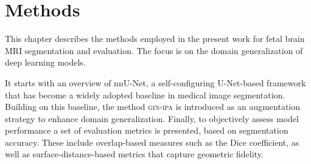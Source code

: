 \chapter{Methods} \label{chap:Methods}
\vspace{1cm}

This chapter describes the methods employed in the present work for fetal brain MRI segmentation and evaluation. The focus is on the domain generalization of deep learning models.

It starts with an overview of nnU-Net, a self-configuring U-Net-based framework that has become a widely adopted baseline in medical image segmentation. Building on this baseline, the method \textsc{gin-ipa} is introduced as an augmentation strategy to enhance domain generalization. Finally, to objectively assess model performance a set of evaluation metrics is presented, based on segmentation accuracy. These include overlap-based measures such as the Dice coefficient, as well as surface-distance-based metrics that capture geometric fidelity.

